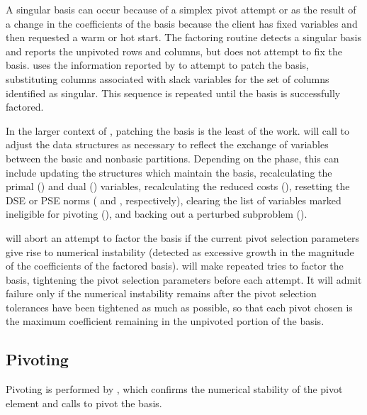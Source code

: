 A singular basis can occur because of a simplex pivot attempt or as the result
of a change in the coefficients of the basis because the client has fixed
variables and then requested a warm or hot start.
The factoring routine  detects a singular basis and
reports the unpivoted rows and columns, but does not attempt to fix the basis.
 uses the information reported by  to
attempt to patch the basis,
substituting columns associated with slack variables for the set of columns
identified as singular.
This sequence is repeated until the basis is successfully factored.

In the larger context of \dylp, patching the basis is the least of
the work.
 will call  to adjust the \dylp data
structures as necessary to reflect the exchange of variables between the
basic and nonbasic partitions.
Depending on the phase, this can include updating the structures which
maintain the basis, recalculating the primal ()
and dual () variables,
recalculating the reduced costs (),
resetting the DSE or PSE norms ( and ,
respectively), clearing the list of variables marked
ineligible for pivoting (), and backing out a perturbed
subproblem (). 

 will abort an attempt to factor the basis if the current
pivot selection parameters give rise to numerical instability (detected as
excessive growth in the magnitude of the coefficients of the factored basis).
 will make repeated tries to factor the basis, tightening
the pivot selection parameters before each attempt.
It will admit failure only if the numerical instability remains after the
pivot selection tolerances have been tightened as much as possible, so that
each pivot chosen is the maximum coefficient remaining in the unpivoted
portion of the basis.

\subsection{Pivoting}
\label{sec:BasisPivoting}

Pivoting is performed by , which confirms the numerical
stability of the pivot element and calls  to pivot
the basis.


